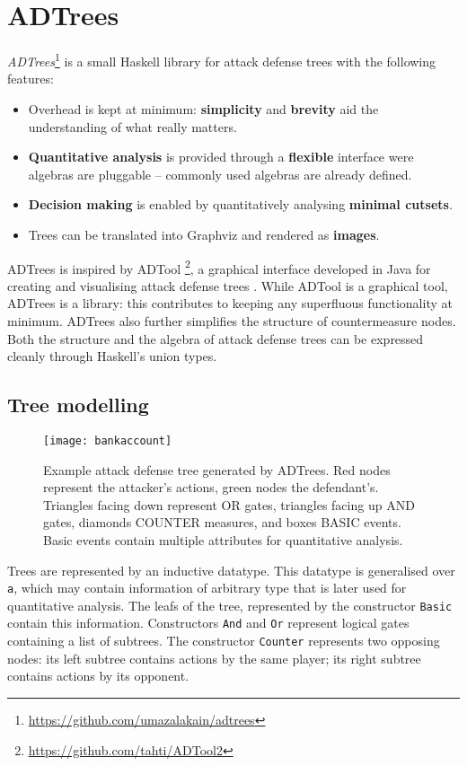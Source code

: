 \documentclass{scrreprt}
\begin{document}
\section{ADTrees}

\textit{ADTrees}\footnote{\url{https://github.com/umazalakain/adtrees}}
is a small Haskell library for attack defense trees with the following features:

\begin{itemize}
    \item Overhead is kept at minimum: \textbf{simplicity} and \textbf{brevity}
        aid the understanding of what really matters.
    \item \textbf{Quantitative analysis} is provided through a \textbf{flexible}
        interface were algebras are pluggable -- commonly used algebras are
        already defined.
    \item \textbf{Decision making} is enabled by quantitatively analysing
        \textbf{minimal cutsets}.
    \item Trees can be translated into Graphviz and rendered as \textbf{images}.
\end{itemize}

ADTrees is inspired by ADTool \footnote{\url{https://github.com/tahti/ADTool2}},
a graphical interface developed in Java for creating and visualising attack
defense trees \cite{KordyTool}. While ADTool is a graphical tool, ADTrees is a
library: this contributes to keeping any superfluous functionality at minimum.
ADTrees also further simplifies the structure of countermeasure nodes. Both the
structure and the algebra of attack defense trees can be expressed cleanly
through Haskell's union types.

\subsection{Tree modelling}

\begin{figure}[h!]
    \label{example-adt}
    \centering
    \texttt{[image: bankaccount]}
    \caption{Example attack defense tree generated by ADTrees. Red nodes
    represent the attacker's actions, green nodes the defendant's. Triangles
    facing down represent OR gates, triangles facing up AND gates, diamonds
    COUNTER measures, and boxes BASIC events.  Basic events contain multiple
    attributes for quantitative analysis.}
\end{figure}

Trees are represented by an inductive datatype. This datatype is generalised
over \texttt{a}, which may contain information of arbitrary type that is later
used for quantitative analysis. The leafs of the tree, represented by the
constructor \texttt{Basic} contain this information. Constructors
\texttt{And} and \texttt{Or} represent logical gates
containing a list of subtrees. The constructor \texttt{Counter}
represents two opposing nodes: its left subtree contains actions by the same
player; its right subtree contains actions by its opponent.
\end{document}
